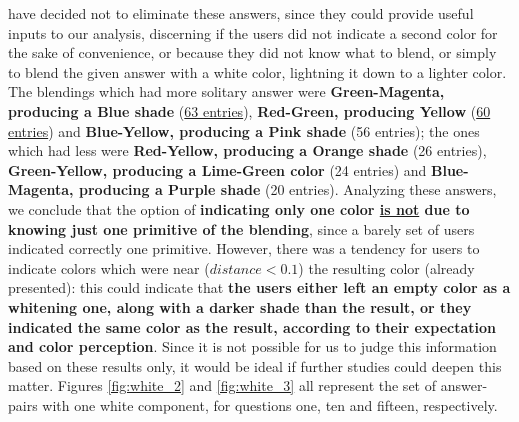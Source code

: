 have decided not to eliminate these answers, since they could provide useful inputs to our analysis, discerning if the users did not indicate a second color for the sake of convenience, or because they did not know what to blend, or simply to blend the given
answer with a white color, lightning it down to a lighter color. The blendings which had more solitary answer were \textbf{Green-Magenta, producing a Blue shade} (\ul{63 entries}), \textbf{Red-Green, producing Yellow} (\ul{60 entries}) and
\textbf{Blue-Yellow, producing a Pink shade} (56 entries); the ones which had less were \textbf{Red-Yellow, producing a Orange shade} (26 entries), \textbf{Green-Yellow, producing a Lime-Green color} (24 entries) and \textbf{Blue-Magenta,
producing a Purple shade} (20 entries). Analyzing these answers, we conclude that the option of \textbf{indicating only one color \ul{is not} due to knowing just one primitive of the blending}, since a barely set of users indicated correctly one primitive.
However, there was a tendency for users to indicate colors which were near ($distance < 0.1$) the resulting color (already presented): this could indicate that \textbf{the users either left an empty color as a whitening one, along with a darker shade than the
result, or they indicated the same color as the result, according to their expectation and color perception}. Since it is not possible for us to judge this information based on these results only, it would be ideal if further studies could deepen this matter.
Figures \ref{fig:white_2} and \ref{fig:white_3} all represent the set of answer-pairs with one white component, for questions one, ten and fifteen, respectively. \par
%
